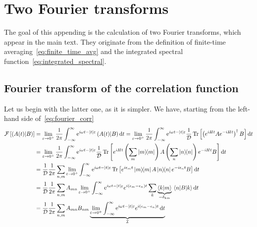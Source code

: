 \chapter{Two Fourier transforms\label{app:fourier}}
\thispagestyle{chapterBeginStyle}
The goal of this appending is the calculation of two Fourier transforms, which appear in the main text.
They originate from the definition of finite-time averaging~\eqref{eq:finite_time_avg} and
the integrated spectral function~\eqref{eq:integrated_spectral}.

\section{Fourier transform of the correlation function}
Let us begin with the latter one,
as it is simpler. We have, starting from the left-hand side of~\eqref{eq:fourier_corr}
\begin{align}
    \mathcal{F}\left[\hs{A(t)}{B}\right] & = \lim _{\varepsilon \to 0^+} \frac{1}{2 \pi} \int_{-\infty}^{\infty}
    \mathrm{e}^{i \omega t- \vert t \vert  \varepsilon}\hs{A(t)}{B} \dd{t} = \lim _{\varepsilon \to 0^+} \frac{1}{2 \pi}
    \int_{-\infty}^{\infty} \mathrm{e}^{i \omega t-\vert t \vert  \varepsilon} \frac{1}{\dimension}
    \Tr\left[\left(e^{iHt}Ae^{-iHt}\right)^{\dagger}B\right] \dd{t} \nonumber                                                             \\
                                         & =\lim _{\varepsilon \to 0^+} \frac{1}{2 \pi}
    \int_{-\infty}^{\infty} \mathrm{e}^{i \omega t-|t| \varepsilon} \frac{1}{\dimension}
    \Tr\left[e^{iHt}\left(\sum_{m} \ketbra{m}{m}\right)
    A\left(\sum_{n} \ketbra{n}{n}\right)e^{-iHt}B\right]\dd{t}  \nonumber                                                                 \\
                                         & = \frac{1}{\dimension} \frac{1}{2 \pi}\sum_{n,m} \lim _{\varepsilon \to 0^+}
    \int_{-\infty}^{\infty} \mathrm{e}^{i \omega t-\vert t \vert  \varepsilon}
    \Tr\left[e^{i \epsilon_m t}\ketbra{m}{m} A\ketbra{n}{n}e^{-i \epsilon_n t}B\right] \dd{t} \nonumber                                   \\
                                         & = \frac{1}{\dimension} \frac{1}{2 \pi}\sum_{n,m} A_{mn}  \lim _{\varepsilon \to 0^+}
    \int_{-\infty}^{\infty} \mathrm{e}^{i \omega t-|t| \varepsilon}e^{i (\epsilon_m-\epsilon_n) t}
    \sum_{k} \underbrace{\braket{k}{m}}_{=\delta_{km}} \matrixel{n}{B}{k} \dd{t} \nonumber                                                \\
                                         & = \frac{1}{\dimension} \frac{1}{2 \pi}\sum_{n,m} A_{mn} B_{nm}  \underbrace{\lim _{\varepsilon
        \to 0^+} \int_{-\infty}^{\infty} \mathrm{e}^{i \omega t-\vert t \vert
        \varepsilon}e^{i (\epsilon_m-\epsilon_n) t}\dd{t} }_{\mathcal{I}}\label{eq:spectral function simplified}
\end{align}
